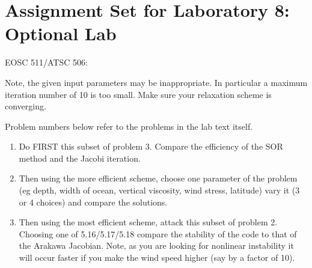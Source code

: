 \documentclass[12pt]{article}
\begin{document}
\section*{Assignment Set for Laboratory 8: Optional Lab}

EOSC 511/ATSC 506: 

 Note, the given input parameters may be inappropriate.  In particular
a maximum iteration number of 10 is too small.  Make sure your
relaxation scheme is converging.

Problem numbers below refer to the problems in the lab text itself.



\begin{enumerate}
\item Do FIRST this subset of problem 3.  Compare the efficiency of the 
SOR method and the Jacobi iteration. 

\item Then using the more efficient scheme, 
choose one parameter of the problem
(eg depth, width of ocean, vertical viscosity, wind stress, latitude)
vary it (3 or 4 choices) and compare the solutions.

\item Then using the most efficient scheme, attack this subset of problem 2.  
Choosing one of 5.16/5.17/5.18 compare the stability of the code to that of the
Arakawa Jacobian.  Note, as you are looking for nonlinear instability
it will occur faster if you make the wind speed higher (say by a factor
of 10).

\end{enumerate}
\end{document}
